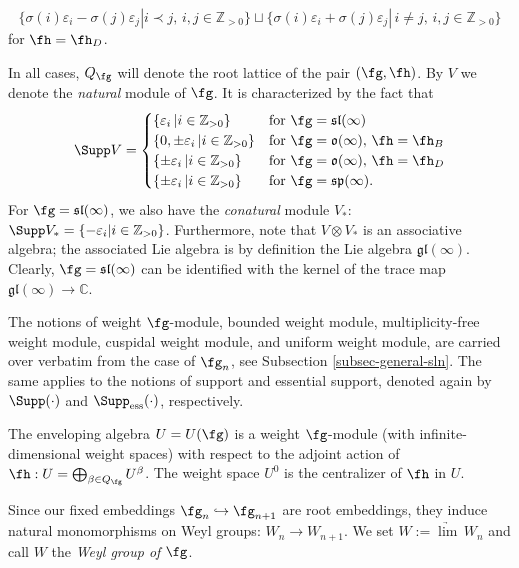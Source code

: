 \documentclass[12pt]{amsart}
\begin{document}
$$\{\sigma(i)\varepsilon_i-\sigma(j)\varepsilon_j| i\prec j, \, i,j\in \mathbb{Z}_{> 0}\}\sqcup\{\sigma(i)\varepsilon_i+\sigma(j)\varepsilon_j|  \, i\neq j,\, i,j\in \mathbb{Z}_{> 0}\}$$
for $\fh=\fh_D$.

In all cases, $Q_{\fg}$ will denote the root lattice of the pair $(\fg,\fh)$. By $V$ we denote the \emph{natural} module of $\fg$. It is characterized by the  fact that  	\begin{equation*}
\Supp V = 
 \begin{cases}
   \{\varepsilon_i \, |i\in \mathbb{Z}_{>0} \}& \text{for} \,\, \fg=\mathfrak{sl}(\infty)  \\ 
   \{0,\pm\varepsilon_i  \, |i\in \mathbb{Z}_{>0} \}& \text{for} \,\, \fg=\mathfrak{o}(\infty), \, \fh=\fh_B\\
  \{\pm\varepsilon_i \, |i\in \mathbb{Z}_{>0} \} & \text{for} \,\, \fg=\mathfrak{o}(\infty), \, \fh=\fh_D\\
  \{\pm\varepsilon_i  \, |i\in \mathbb{Z}_{>0} \} & \text{for} \,\, \fg=\mathfrak{sp}(\infty).
 \end{cases}
\end{equation*}
For $\fg=\mathfrak{sl}(\infty)$, we also have the \emph{conatural} module $V_*$: $\Supp V_*=\{-\varepsilon_i| i\in \mathbb{Z}_{>0}\}$. Furthermore, note that $V\otimes V_*$ is an associative algebra; the associated Lie algebra is by definition the Lie algebra $\mathfrak{gl}(\infty)$. Clearly, $\fg=\mathfrak{sl}(\infty)$ can be identified with the kernel of the trace map $\mathfrak{gl}(\infty)\to\mathbb{C}$.

The notions of weight $\fg$-module, bounded weight module, multiplicity-free weight module, cuspidal weight module, and uniform weight module, are carried over verbatim from the case of $\fg_n$, see Subsection \ref{subsec-general-sln}. The same applies to the notions of support and essential support, denoted again by $\Supp (\cdot)$ and $\Supp _{\rm ess}(\cdot)$, respectively.


The enveloping algebra $U=U(\fg)$ is a weight $\fg$-module (with infinite-dimensional weight spaces) with respect to the adjoint action of $\fh:U=\bigoplus_{\beta \in Q_\fg} U^\beta$. The weight space $U^0$ is the centralizer of $\fh$ in $U$.

Since our fixed embeddings $\fg_n\hookrightarrow\fg_{n+1}$ are root embeddings, they induce natural monomorphisms on Weyl groups: $W_n\to W_{n+1}$. We set $W:=\underrightarrow\lim\, W_n$  and call $W$ the \emph{Weyl group of} $\fg$.
\end{document}
